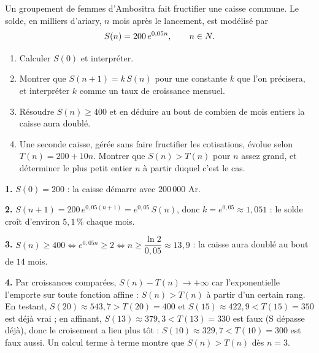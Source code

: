 \begin{jecherche}
Un groupement de femmes d'Ambositra fait fructifier une caisse commune. Le
solde, en milliers d'ariary, $n$ mois après le lancement, est modélisé par
\[
  S(n) = 200\,e^{0{,}05n}, \qquad n \in N .
\]

\begin{enumerate}[label=\textbf{\arabic*.}, leftmargin=*, itemsep=0.3em]
  \item Calculer $S(0)$ et interpréter.
  \item Montrer que $S(n+1) = k\,S(n)$ pour une constante $k$ que l'on
        précisera, et interpréter $k$ comme un taux de croissance mensuel.
  \item Résoudre $S(n) \geq 400$ et en déduire au bout de combien de mois
        entiers la caisse aura doublé.
  \item Une seconde caisse, gérée sans faire fructifier les cotisations,
        évolue selon $T(n) = 200+10n$. Montrer que $S(n) > T(n)$ pour $n$
        assez grand, et déterminer le plus petit entier $n$ à partir duquel
        c'est le cas.
\end{enumerate}
\end{jecherche}

\begin{corrige}
\textbf{1.} $S(0) = 200$ : la caisse démarre avec $200\,000$ Ar.

\textbf{2.} $S(n+1) = 200\,e^{0{,}05(n+1)} = e^{0{,}05}\,S(n)$, donc
$k = e^{0{,}05} \approx 1{,}051$ : le solde croît d'environ $5{,}1\,\%$ chaque
mois.

\textbf{3.} $S(n) \geq 400 \iff e^{0{,}05n} \geq 2 \iff n \geq
\dfrac{\ln 2}{0{,}05} \approx 13{,}9$ : la caisse aura doublé au bout de
$14$ mois.

\textbf{4.} Par croissances comparées, $S(n)-T(n) \to +\infty$ car
l'exponentielle l'emporte sur toute fonction affine : $S(n)>T(n)$ à partir
d'un certain rang. En testant, $S(20) \approx 543{,}7 > T(20) = 400$ et
$S(15) \approx 422{,}9 < T(15) = 350$ est déjà vrai ; en affinant,
$S(13) \approx 379{,}3 < T(13) = 330$ est faux (S dépasse déjà), donc le
croisement a lieu plus tôt : $S(10) \approx 329{,}7 < T(10) = 300$ est faux
aussi. Un calcul terme à terme montre que $S(n) > T(n)$ dès $n = 3$.
\end{corrige}

